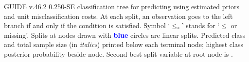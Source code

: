 \documentclass{article}
\begin{document}
GUIDE v.46.2 0.250-SE
classification tree for predicting \texttt{} using
estimated priors
and unit misclassification costs.
At each split, an observation goes to the left branch 
 if and only if the condition is satisfied.
 Symbol `$\leq_*$' stands for `$\leq$ or missing'.
 Splits at nodes drawn with \textbf{\textcolor{blue}{blue}} circles are linear splits.
 Predicted class and total sample size (in \emph{italics}) printed below each terminal node;
 highest class posterior probability beside node.
 Second best split variable at root node is \texttt{}.
 
\end{document}
